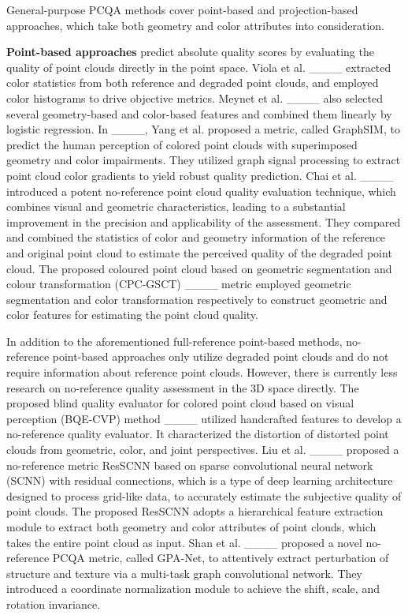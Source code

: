 General-purpose PCQA methods cover point-based and projection-based approaches, which take both geometry and color attributes into consideration.

\textbf{Point-based approaches} predict absolute quality scores by evaluating the quality of point clouds directly in the point space. 
Viola et al. ____ extracted color statistics from both reference and degraded point clouds, and employed color histograms to drive objective metrics.
Meynet et al. ____ also selected several geometry-based and color-based features and combined them linearly by logistic regression.
In ____, Yang et al. proposed a metric, called GraphSIM, to predict the human perception of colored point clouds with superimposed geometry and color impairments.
They utilized graph signal processing to extract point cloud color gradients to yield robust quality prediction. 
Chai et al. ____ introduced a potent no-reference point cloud quality evaluation technique, which combines visual and geometric characteristics, leading to a substantial improvement in the precision and applicability of the assessment.
They compared and combined the statistics of color and geometry information of the reference and original point cloud to estimate the perceived quality of the degraded point cloud.
The proposed coloured point cloud based on geometric segmentation and colour transformation (CPC-GSCT) ____ metric employed geometric segmentation and color transformation respectively to construct geometric and color features for estimating the point cloud quality.

In addition to the aforementioned full-reference point-based methods, no-reference point-based approaches only utilize degraded point clouds and do not require information about reference point clouds.
However, there is currently less research on no-reference quality assessment in the 3D space directly.
The proposed blind quality evaluator for colored point cloud based on visual perception (BQE-CVP) method ____ utilized handcrafted features to develop a no-reference quality evaluator.  
It characterized the distortion of distorted point clouds from geometric, color, and joint perspectives.
Liu et al. ____ proposed a no-reference metric ResSCNN based on sparse convolutional neural network (SCNN) with residual connections, which is a type of deep learning architecture designed to process grid-like data, to accurately estimate the subjective quality of point clouds.
The proposed ResSCNN adopts a hierarchical feature extraction module to extract both geometry and color attributes of point clouds, which takes the entire point cloud as input.
Shan et al. ____ proposed a novel no-reference PCQA metric, called GPA-Net, to attentively extract perturbation of structure and texture via a multi-task graph convolutional network.
They introduced a coordinate normalization module to achieve the shift, scale, and rotation invariance.


